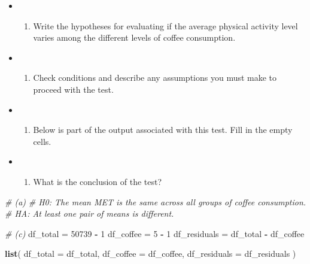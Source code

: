 \documentclass[]{book}
\newenvironment{Shaded}{\begin{snugshade}}{\end{snugshade}}
\newcommand{\CommentTok}[1]{\textcolor[rgb]{0.56,0.35,0.01}{\textit{#1}}}
\newcommand{\DataTypeTok}[1]{\textcolor[rgb]{0.13,0.29,0.53}{#1}}
\newcommand{\DecValTok}[1]{\textcolor[rgb]{0.00,0.00,0.81}{#1}}
\newcommand{\KeywordTok}[1]{\textcolor[rgb]{0.13,0.29,0.53}{\textbf{#1}}}
\newcommand{\NormalTok}[1]{#1}
\newcommand{\OperatorTok}[1]{\textcolor[rgb]{0.81,0.36,0.00}{\textbf{#1}}}
\newcommand{\StringTok}[1]{\textcolor[rgb]{0.31,0.60,0.02}{#1}}
\providecommand{\tightlist}{%
  \setlength{\itemsep}{0pt}\setlength{\parskip}{0pt}}
\begin{document}
\begin{itemize}
\item
  \begin{enumerate}
  \def\labelenumi{(\alph{enumi})}
  \tightlist
  \item
    Write the hypotheses for evaluating if the average physical activity level varies among the different levels of coffee consumption.
  \end{enumerate}
\item
  \begin{enumerate}
  \def\labelenumi{(\alph{enumi})}
  \setcounter{enumi}{1}
  \tightlist
  \item
    Check conditions and describe any assumptions you must make to proceed with the test.
  \end{enumerate}
\item
  \begin{enumerate}
  \def\labelenumi{(\alph{enumi})}
  \setcounter{enumi}{2}
  \tightlist
  \item
    Below is part of the output associated with this test. Fill in the empty cells.
  \end{enumerate}
\item
  \begin{enumerate}
  \def\labelenumi{(\alph{enumi})}
  \setcounter{enumi}{3}
  \tightlist
  \item
    What is the conclusion of the test?
  \end{enumerate}
\end{itemize}

\begin{Shaded}
\begin{Highlighting}[]
\CommentTok{# (a)}
\CommentTok{# H0: The mean MET is the same across all groups of coffee consumption.}
\CommentTok{# HA: At least one pair of means is different.}
\end{Highlighting}
\end{Shaded}

\begin{Shaded}
\begin{Highlighting}[]
\CommentTok{# (c)}
\NormalTok{df_total =}\StringTok{ }\DecValTok{50739} \OperatorTok{-}\StringTok{ }\DecValTok{1}
\NormalTok{df_coffee =}\StringTok{ }\DecValTok{5} \OperatorTok{-}\StringTok{ }\DecValTok{1}
\NormalTok{df_residuals =}\StringTok{ }\NormalTok{df_total }\OperatorTok{-}\StringTok{ }\NormalTok{df_coffee}

\KeywordTok{list}\NormalTok{(}
  \DataTypeTok{df_total =}\NormalTok{ df_total, }
  \DataTypeTok{df_coffee =}\NormalTok{ df_coffee, }
  \DataTypeTok{df_residuals =}\NormalTok{ df_residuals}
\NormalTok{)}
\end{Highlighting}
\end{Shaded}
\end{document}
